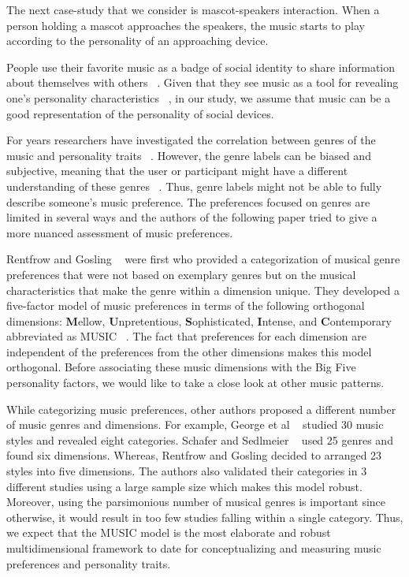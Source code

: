 The next case-study that we consider is mascot-speakers interaction.
When a person holding a mascot approaches the speakers,
the music starts to play according to the personality of an approaching device.

People use their favorite music as a badge of social identity to share
information about themselves with others ~\cite{boer2011shared,rentfrow2007content}.
Given that they see music as a tool for revealing one’s personality characteristics ~\cite{rentfrow2006message},
in our study, we assume that music can be a good representation of the personality of social devices.

For years researchers have investigated the correlation between genres of the music and personality
traits ~\cite{schafer2009functions,george2007association,zweigenhaft2008re,dunn2012toward}.
However, the genre labels can be biased and subjective, meaning that the user or
participant might have a different understanding of these genres ~\cite{rentfrow2011structure}.
Thus, genre labels might not be able to fully describe someone’s music preference.
The preferences focused on genres are limited in several ways and the authors of the
following paper tried to give a more nuanced assessment of music preferences.

Rentfrow and Gosling ~\cite{rentfrow2003re} were first who provided a categorization
of musical genre preferences that were not based on exemplary genres but on the musical
characteristics that make the genre within a dimension unique.
They developed a five-factor model of music preferences in terms of the
following orthogonal dimensions: \textbf{M}ellow, \textbf{U}npretentious, \textbf{S}ophisticated,
\textbf{I}ntense, and \textbf{C}ontemporary abbreviated as MUSIC ~\cite{rentfrow2011structure}.
The fact that preferences for each dimension are independent of the preferences
from the other dimensions makes this model orthogonal.
Before associating these music dimensions with the Big Five personality factors,
we would like to take a close look at other music patterns.

While categorizing music preferences, other authors proposed a different number of music genres and dimensions.
For example, George et al ~\cite{george2007association} studied 30 music styles and revealed eight categories.
Schafer and Sedlmeier ~\cite{schafer2009functions} used 25 genres and found six dimensions.
Whereas, Rentfrow and Gosling decided to arranged 23 styles into five dimensions.
The authors also validated their categories in 3 different studies
using a large sample size which makes this model robust.
Moreover, using the parsimonious number of musical genres is important since otherwise,
it would result in too few studies falling within a single category.
Thus, we expect that the MUSIC model is the most elaborate and robust
multidimensional framework to date for conceptualizing and measuring music preferences and personality traits.

